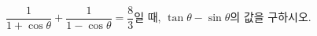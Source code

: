 $\dfrac{1}{1+\cos\theta}+\dfrac{1}{1-\cos\theta}=\dfrac{8}{3}$일 때, $\tan\theta-\sin\theta$의 값을 구하시오. 
